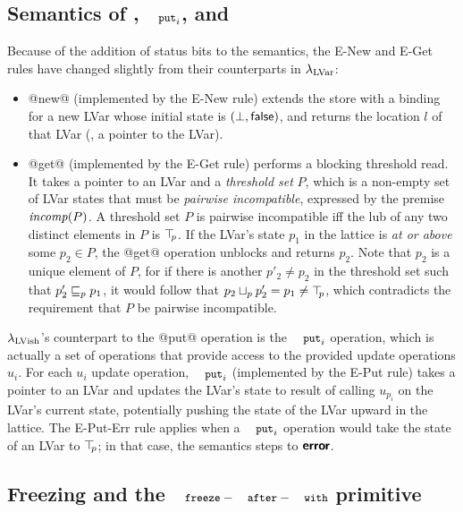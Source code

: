 \FigLambdaLVishReductionSemantics

\FigLambdaLVishContextSemantics

\subsection{Semantics of , $\PUTi$, and }\label{subsection:quasi-semantics-of-new-put-and-get}

Because of the addition of status bits to the semantics, the {\sc
  E-New} and {\sc E-Get} rules have changed slightly from their
counterparts in $\lambda_{\textrm{LVar}}$:

\begin{itemize}
\item @new@ (implemented by the {\sc E-New} rule) extends the store
  with a binding for a new LVar whose initial state is $(\bot,
  \textsf{false})$, and returns the location $l$ of that LVar (\ie, a
  pointer to the LVar).
\item @get@ (implemented by the {\sc E-Get} rule) performs a blocking
  threshold read.  It takes a pointer to an LVar and a \emph{threshold
    set} $P$, which is a non-empty set of LVar states that must be
  \emph{pairwise incompatible}, expressed by the premise $\mathit{incomp}(P)$.
  A threshold set $P$ is pairwise incompatible iff the lub of any two
  distinct elements in $P$ is $\top\hspace{-0.85mm}_{p}$.  If the LVar's state $p_1$ in
  the lattice is \emph{at or above} some $p_2 \in P$, the @get@
  operation unblocks and returns $p_2$.  Note that $p_2$ is a unique
  element of $P$, for if there is another $p'_2 \neq p_2$ in the
  threshold set such that $p'_2 \sqsubseteq_p p_1$, it would follow that
  $p_2 \sqcup_p p'_2 = p_1 \neq \top\hspace{-0.85mm}_{p}$, which contradicts the
  requirement that $P$ be pairwise incompatible.
\end{itemize}

$\lambda_{\textrm{LVish}}$'s counterpart to the @put@ operation is the $\PUTi$
operation, which is actually a set of operations that provide access
to the provided update operations $u_i$.  For each $u_i$ update
operation, $\PUTi$ (implemented by the {\sc E-Put} rule) takes a
pointer to an LVar and updates the LVar's state to result of calling
$u_{p_i}$ on the LVar's current state, potentially pushing the state
of the LVar upward in the lattice.  The {\sc E-Put-Err} rule applies
when a $\PUTi$ operation would take the state of an LVar to $\top\hspace{-0.85mm}_{p}$;
in that case, the semantics steps to $\textbf{\textsf{error}}$.

\subsection{Freezing and the $\FAW$ primitive}\label{subsection:quasi-freezing}

